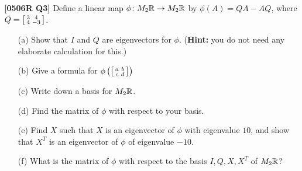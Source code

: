 \documentclass[a4paper]{article}
\begin{document}
\begin{problem}\textbf{[0506R Q3]}
 Define a linear map $\phi\colon M_2{\mathbb{R}}\to M_2{\mathbb{R}}$ by $\phi(A)=QA-AQ$, where
 $Q=\left[\begin{smallmatrix} 3&4\\4&-3\end{smallmatrix}\right]$.
 \begin{itemize}
  \item[(a)] Show that $I$ and $Q$ are eigenvectors for $\phi$.
   (\textbf{Hint:} you do not need any elaborate calculation for
   this.) 
  \item[(b)] Give a formula for $\phi\left(\left[\begin{smallmatrix} a&b\\ c&d\end{smallmatrix}\right]\right)$
  \item[(c)] Write down a basis for $M_2{\mathbb{R}}$. 
  \item[(d)] Find the matrix of $\phi$ with respect to your
   basis. 
  \item[(e)] Find $X$ such that $X$ is an eigenvector of $\phi$ with
   eigenvalue $10$, and show that $X^T$ is an eigenvector of $\phi$ of
   eigenvalue $-10$. 
  \item[(f)] What is the matrix of $\phi$ with respect to the basis
   $I,Q,X,X^T$ of $M_2{\mathbb{R}}$? 
 \end{itemize}
\end{problem}
\end{document}
